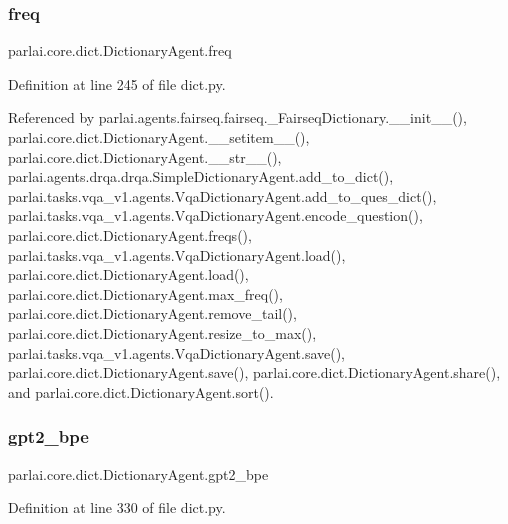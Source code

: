 \subsubsection{\texorpdfstring{freq}{freq}}
{\footnotesize\ttfamily parlai.\+core.\+dict.\+Dictionary\+Agent.\+freq}



Definition at line 245 of file dict.\+py.



Referenced by parlai.\+agents.\+fairseq.\+fairseq.\+\_\+\+Fairseq\+Dictionary.\+\_\+\+\_\+init\+\_\+\+\_\+(), parlai.\+core.\+dict.\+Dictionary\+Agent.\+\_\+\+\_\+setitem\+\_\+\+\_\+(), parlai.\+core.\+dict.\+Dictionary\+Agent.\+\_\+\+\_\+str\+\_\+\+\_\+(), parlai.\+agents.\+drqa.\+drqa.\+Simple\+Dictionary\+Agent.\+add\+\_\+to\+\_\+dict(), parlai.\+tasks.\+vqa\+\_\+v1.\+agents.\+Vqa\+Dictionary\+Agent.\+add\+\_\+to\+\_\+ques\+\_\+dict(), parlai.\+tasks.\+vqa\+\_\+v1.\+agents.\+Vqa\+Dictionary\+Agent.\+encode\+\_\+question(), parlai.\+core.\+dict.\+Dictionary\+Agent.\+freqs(), parlai.\+tasks.\+vqa\+\_\+v1.\+agents.\+Vqa\+Dictionary\+Agent.\+load(), parlai.\+core.\+dict.\+Dictionary\+Agent.\+load(), parlai.\+core.\+dict.\+Dictionary\+Agent.\+max\+\_\+freq(), parlai.\+core.\+dict.\+Dictionary\+Agent.\+remove\+\_\+tail(), parlai.\+core.\+dict.\+Dictionary\+Agent.\+resize\+\_\+to\+\_\+max(), parlai.\+tasks.\+vqa\+\_\+v1.\+agents.\+Vqa\+Dictionary\+Agent.\+save(), parlai.\+core.\+dict.\+Dictionary\+Agent.\+save(), parlai.\+core.\+dict.\+Dictionary\+Agent.\+share(), and parlai.\+core.\+dict.\+Dictionary\+Agent.\+sort().

\mbox{\label{classparlai_1_1core_1_1dict_1_1DictionaryAgent_ac0fbaa96f4b3d1cef6628da8320d4bc2}} 
\subsubsection{\texorpdfstring{gpt2\+\_\+bpe}{gpt2\_bpe}}
{\footnotesize\ttfamily parlai.\+core.\+dict.\+Dictionary\+Agent.\+gpt2\+\_\+bpe}



Definition at line 330 of file dict.\+py.



